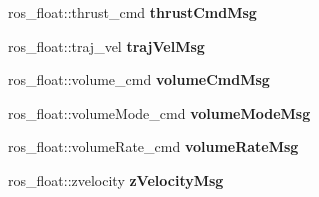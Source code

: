 \begin{DoxyCompactItemize}
ros\+\_\+float\+::thrust\+\_\+cmd {\bfseries thrust\+Cmd\+Msg}
\item 
\mbox{\label{classSTATE__reader_a6410f8402db53ac32f8f9acc0497c688}} 
ros\+\_\+float\+::traj\+\_\+vel {\bfseries traj\+Vel\+Msg}
\item 
\mbox{\label{classSTATE__reader_acd1b627deab82b59ac115e7145a2deae}} 
ros\+\_\+float\+::volume\+\_\+cmd {\bfseries volume\+Cmd\+Msg}
\item 
\mbox{\label{classSTATE__reader_ae5dc8cfe4eade7a8678ef6cc88a4631a}} 
ros\+\_\+float\+::volume\+Mode\+\_\+cmd {\bfseries volume\+Mode\+Msg}
\item 
\mbox{\label{classSTATE__reader_a4b94f921036ff4fbe401065a75946655}} 
ros\+\_\+float\+::volume\+Rate\+\_\+cmd {\bfseries volume\+Rate\+Msg}
\item 
\mbox{\label{classSTATE__reader_aafd4bfba38382d9234a5f555b9225912}} 
ros\+\_\+float\+::zvelocity {\bfseries z\+Velocity\+Msg}
\end{DoxyCompactItemize}
